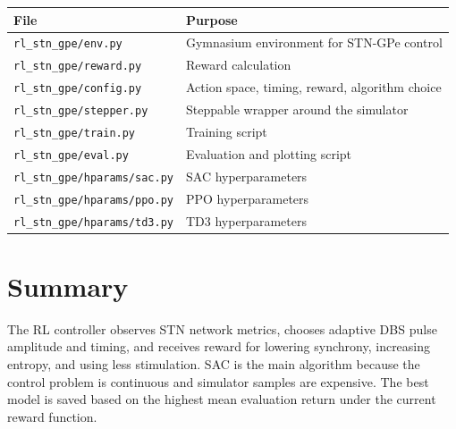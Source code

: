 \documentclass[11pt]{article}
\begin{document}
\begin{table}[h]
\centering
\begin{tabular}{ll}
\toprule
\textbf{File} & \textbf{Purpose} \\
\midrule
\texttt{rl\_stn\_gpe/env.py} & Gymnasium environment for STN-GPe control \\
\texttt{rl\_stn\_gpe/reward.py} & Reward calculation \\
\texttt{rl\_stn\_gpe/config.py} & Action space, timing, reward, algorithm choice \\
\texttt{rl\_stn\_gpe/stepper.py} & Steppable wrapper around the simulator \\
\texttt{rl\_stn\_gpe/train.py} & Training script \\
\texttt{rl\_stn\_gpe/eval.py} & Evaluation and plotting script \\
\texttt{rl\_stn\_gpe/hparams/sac.py} & SAC hyperparameters \\
\texttt{rl\_stn\_gpe/hparams/ppo.py} & PPO hyperparameters \\
\texttt{rl\_stn\_gpe/hparams/td3.py} & TD3 hyperparameters \\
\bottomrule
\end{tabular}
\end{table}

\section{Summary}

The RL controller observes STN network metrics, chooses adaptive DBS pulse
amplitude and timing, and receives reward for lowering synchrony, increasing
entropy, and using less stimulation. SAC is the main algorithm because the
control problem is continuous and simulator samples are expensive. The best
model is saved based on the highest mean evaluation return under the current
reward function.
\end{document}
